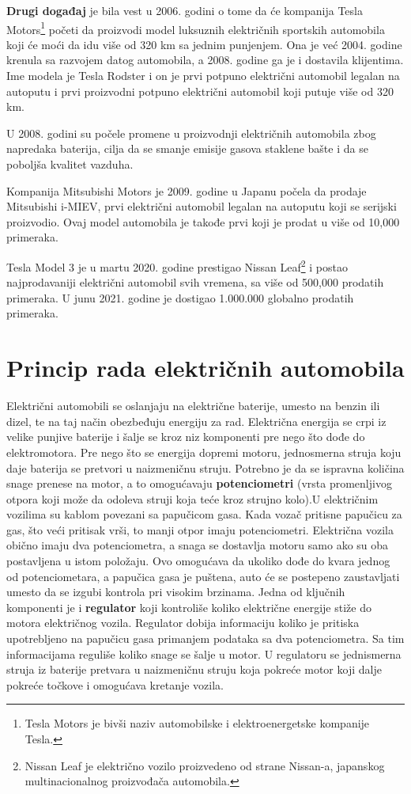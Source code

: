 \documentclass[a4paper]{article}
\begin{document}
\textbf{Drugi događaj} je bila vest u 2006. godini o tome da će kompanija Tesla Motors\footnote{Tesla Motors je bivši naziv automobilske i elektroenergetske kompanije Tesla.} početi da proizvodi model luksuznih električnih sportskih automobila koji će moći da idu više od 320 km sa jednim punjenjem. Ona je već 2004. godine krenula  sa razvojem datog automobila, a 2008. godine ga je i dostavila klijentima. Ime modela je Tesla Rodster i on je prvi potpuno električni automobil legalan na autoputu i prvi proizvodni potpuno električni automobil koji putuje više od 320 km.

U 2008. godini su počele promene u proizvodnji električnih automobila zbog napredaka baterija, cilja da se smanje emisije gasova staklene bašte i da se poboljša kvalitet vazduha.

Kompanija Mitsubishi Motors je 2009. godine u Japanu počela da prodaje Mitsubishi i-MIEV, prvi električni automobil legalan na autoputu koji se serijski proizvodio. Ovaj model automobila je takođe prvi koji je prodat u više od 10,000 primeraka.

Tesla Model 3 je u martu 2020. godine prestigao Nissan Leaf\footnote{Nissan Leaf je električno vozilo proizvedeno od strane Nissan-a, japanskog multinacionalnog proizvođača automobila.} i postao najprodavaniji električni automobil svih vremena, sa više od 500,000 prodatih primeraka. U junu 2021. godine je dostigao 1.000.000 globalno prodatih primeraka.
 

\section{Princip rada električnih automobila}

Električni automobili se oslanjaju na električne baterije, umesto na benzin ili dizel, te na taj način obezbeđuju energiju za rad. Električna energija se crpi iz velike punjive baterije i šalje se kroz niz komponenti pre nego što dođe do elektromotora. Pre nego što se energija dopremi motoru, jednosmerna struja koju daje baterija se pretvori u naizmeničnu struju.
Potrebno je da se ispravna količina snage prenese na motor, a to omogućavaju \textbf{potenciometri} (vrsta promenljivog otpora koji može da odoleva struji koja teće kroz strujno kolo).U električnim vozilima su kablom povezani sa papučicom gasa. Kada vozač pritisne papučicu za gas, što veći pritisak vrši, to manji otpor imaju potenciometri. Električna vozila obično imaju dva potenciometra, a snaga se dostavlja motoru samo ako su oba postavljena u istom položaju. Ovo omogućava da ukoliko dođe do kvara jednog od potenciometara, a papučica gasa je puštena, auto će se postepeno zaustavljati umesto da se izgubi kontrola pri visokim brzinama. Jedna od ključnih komponenti je i \textbf{regulator} koji kontroliše koliko električne energije stiže do motora električnog vozila. Regulator dobija informaciju koliko je pritiska upotrebljeno na papučicu gasa primanjem podataka sa dva potenciometra. Sa tim informacijama reguliše koliko snage se šalje u motor. U regulatoru se jednismerna struja iz baterije pretvara u naizmeničnu struju koja pokreće motor koji dalje pokreće točkove i omogućava kretanje vozila. 
\end{document}
